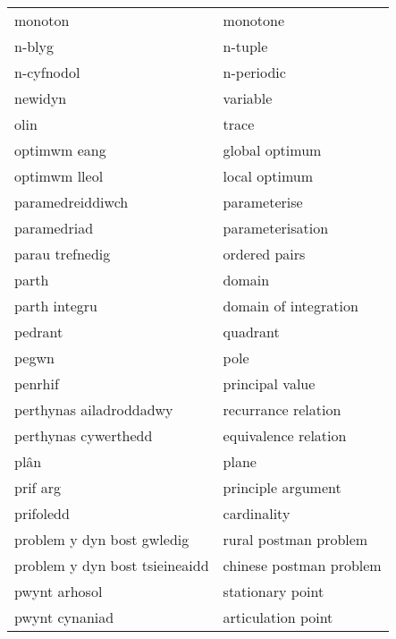 \begin{supertabular}{p{0.22\textwidth}p{0.22\textwidth}}
                         monoton &                          monotone \\
                          n-blyg &                           n-tuple \\
                      n-cyfnodol &                        n-periodic \\
                         newidyn &                          variable \\
                            olin &                             trace \\
                    optimwm eang &                    global optimum \\
                   optimwm lleol &                     local optimum \\
                paramedreiddiwch &                      parameterise \\
                     paramedriad &                  parameterisation \\
                 parau trefnedig &                     ordered pairs \\
                           parth &                            domain \\
                   parth integru &             domain of integration \\
                         pedrant &                          quadrant \\
                           pegwn &                              pole \\
                         penrhif &                   principal value \\
         perthynas ailadroddadwy &               recurrance relation \\
            perthynas cywerthedd &              equivalence relation \\
                            plân &                             plane \\
                        prif arg &                principle argument \\
                       prifoledd &                       cardinality \\
      problem y dyn bost gwledig &             rural postman problem \\
  problem y dyn bost tsieineaidd &           chinese postman problem \\
                   pwynt arhosol &                  stationary point \\
                  pwynt cynaniad &                articulation point \\

\end{supertabular}
